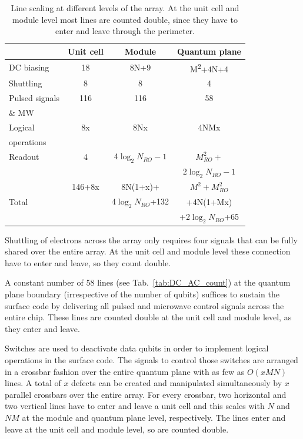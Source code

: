 \documentclass[aps,prl,reprint,superscriptaddress,floatfix]{revtex4-1}
\begin{document}
\begin{table}[t]
    \centering
    \begin{tabular}{l|c|c|c}
         & Unit cell & Module & Quantum plane \\
        \hline \hline
        DC biasing & 18 & 8N+9 & M\textsuperscript{2}+4N+4 \\
        \hline
        Shuttling & 8 & 8 & 4 \\
        \hline
        Pulsed signals & 116 & 116 & 58 \\
        \& MW & & & \\
        \hline
        Logical & 8x & 8Nx & 4NMx \\
        operations & & & \\
        \hline
        Readout & 4 & 4$\log_2 N_{RO}-1$ & $M_{RO}^{2}+$ \\
        & & & $2\log_2 N_{RO}-1$ \\
        \hline \hline
        & 146+8x & 8N(1+x)+ & $M^{2} + M_{RO}^{2}$ \\
        Total & & 4$\log_2 N_{RO}$+132 & +4N(1+Mx) \\
        & & & +2$\log_2 N_{RO}$+65
    \end{tabular}
    \caption{Line scaling at different levels of the array. At the unit cell and module level most lines are counted double, since they have to enter and leave through the perimeter.}
    \label{tab:wire_count}
\end{table}

Shuttling of electrons across the array only requires four signals that can be fully shared over the entire array.
At the unit cell and module level these connection have to enter and leave, so they count double.

A constant number of 58 lines (see Tab.~\ref{tab:DC_AC_count}) at the quantum plane boundary (irrespective of the number of qubits) suffices to sustain the surface code by delivering all pulsed and microwave control signals across the entire chip.
These lines are counted double at the unit cell and module level, as they enter and leave.

Switches are used to deactivate data qubits in order to implement logical operations in the surface code.
The signals to control those switches are arranged in a crossbar fashion over the entire quantum plane with as few as $O(xMN)$ lines.
A total of $x$ defects can be created and manipulated simultaneously by $x$ parallel crossbars over the entire array.
For every crossbar, two horizontal and two vertical lines have to enter and leave a unit cell and this scales with $N$ and $NM$ at the module and quantum plane level, respectively.
The lines enter and leave at the unit cell and module level, so are counted double.
\end{document}

